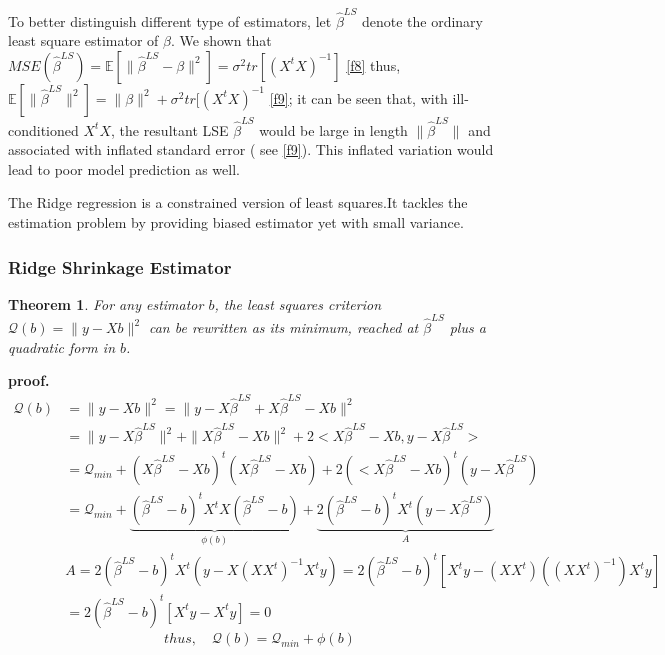\documentclass[12pt]{report}
\newtheorem{theoreme}{Theorem}[section] %
\begin{document}
	To better distinguish different type of estimators, let $\hat{\beta}^{LS}$ denote the ordinary least square estimator of $\beta$. We shown that $MSE(\hat{\beta}^{LS})=\mathbb{E}[\parallel \hat{\beta}^{LS}-\beta \parallel^{2}]=\sigma^{2}tr[(X^{t}X)^{-1}]$ \eqref{f8} thus,$\mathbb{E}[\parallel \hat{\beta}^{LS} \parallel^{2}]=\parallel \beta \parallel^{2} + \sigma^{2}tr[(X^{t}X)^{-1}$ \eqref{f9}; it can be seen that, with ill-conditioned $X^{t}X$, the resultant LSE $\hat{\beta}^{LS}$ would be large in length $\parallel\hat{\beta}^{LS}\parallel$ and associated with inflated standard error ( see \eqref{f9}). This inflated variation would lead to poor model prediction as well.
	
	The Ridge regression is a constrained version of least squares.It tackles the estimation problem by providing biased estimator yet with small variance.
	\begin{center}
		\subsubsection{Ridge Shrinkage Estimator}
	\end{center}
	\begin{theoreme}
		For any estimator $b$, the least squares criterion $	\mathcal{Q}(b)= \parallel y-Xb \parallel^{2}$ can be rewritten as its minimum, reached at $\hat{\beta}^{LS}$ plus a quadratic form in $b$.
	\end{theoreme}
	\textbf{proof.}
	{\selectfont \begin{align*}
			\mathcal{Q}(b)&= \parallel y-Xb \parallel^{2} = \parallel y-X\hat{\beta}^{LS} + X\hat{\beta}^{LS}-Xb\parallel^{2}\\
			&=\parallel y-X\hat{\beta}^{LS}  \parallel^{2} + \parallel X\hat{\beta}^{LS}-Xb  \parallel^{2} +2<X\hat{\beta}^{LS}-Xb, y-X\hat{\beta}^{LS}>\\
			&=\mathcal{Q}_{min} + ( X\hat{\beta}^{LS}-Xb)^{t}( X\hat{\beta}^{LS}-Xb)+2(<X\hat{\beta}^{LS}-Xb)^{t}(y-X\hat{\beta}^{LS}) \\
			&=\mathcal{Q}_{min}+\underbrace{( \hat{\beta}^{LS}-b)^{t}X^{t}X( \hat{\beta}^{LS}-b)}_{\phi(b)}  +\underbrace{2(\hat{\beta}^{LS}-b)^{t}X^{t}(y-X\hat{\beta}^{LS})}_{A} \\
			& A=2(\hat{\beta}^{LS}-b)^{t}X^{t}(y-X(XX^{t})^{-1}X^{t}y)= 2(\hat{\beta}^{LS}-b)^{t}[X^{t}y-(XX^{t})((XX^{t})^{-1})X^{t}y]\\
			&= 2(\hat{\beta}^{LS}-b)^{t}[X^{t}y-X^{t}y]=0
		\end{align*}
		\begin{equation}
			thus,\quad  \mathcal{Q}(b)=\mathcal{Q}_{min} + \phi(b)
			\label{f10}
	\end{equation} }
	
\end{document}
